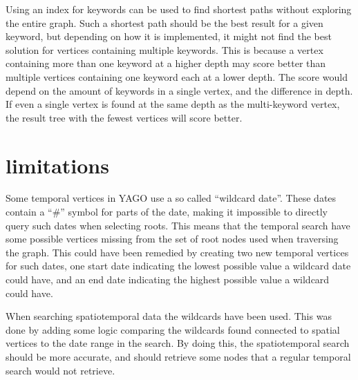 Using an index for keywords can be used to find shortest paths without exploring the entire graph. Such a shortest path should be the best result for a given keyword, but depending on how it is implemented, it might not find the best solution for vertices containing multiple keywords. This is because a vertex containing more than one keyword at a higher depth may score better than multiple vertices containing one keyword each at a lower depth. The score would depend on the amount of keywords in a single vertex, and the difference in depth. If even a single vertex is found at the same depth as the multi-keyword vertex, the result tree with the fewest vertices will score better. 


\section{limitations}

Some temporal vertices in YAGO use a so called ``wildcard date''. These dates contain a ``\#'' symbol for parts of the date, making it impossible to directly query such dates when selecting roots. This means that the temporal search have some possible vertices missing from the set of root nodes used when traversing the graph. This could have been remedied by creating two new temporal vertices for such dates, one start date indicating the lowest possible value a wildcard date could have, and an end date indicating the highest possible value a wildcard could have.

When searching spatiotemporal data the wildcards have been used. This was done by adding some logic comparing the wildcards found connected to spatial vertices to the date range in the search. By doing this, the spatiotemporal search should be more accurate, and should retrieve some nodes that a regular temporal search would not retrieve.

